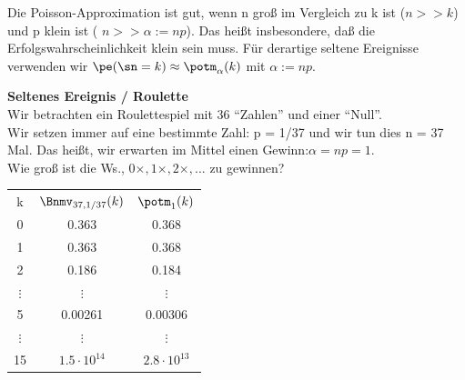 \begin{bem}
    Die Poisson-Approximation ist gut, wenn n groß im Vergleich zu k ist ($n >> k$) und p klein ist (
    $n >> \alpha := np$).
    Das heißt insbesondere, daß die Erfolgswahrscheinlichkeit klein sein muss.
    Für derartige seltene Ereignisse verwenden wir $\pe (\sn = k) \approx \potm_{\alpha}(k)$ mit $\alpha := np$.
\end{bem}


\begin{bsp}
    \textbf{Seltenes Ereignis / Roulette}  \\
    Wir betrachten ein Roulettespiel mit 36 ``Zahlen'' und einer ``Null''. \\
    Wir setzen immer auf eine bestimmte Zahl: p = 1/37 und wir tun dies n = 37 Mal.
    Das heißt, wir erwarten im Mittel einen Gewinn:$\alpha  = np = 1$. \\
    Wie groß ist die Ws., $ 0 \times, 1 \times, 2 \times, ...$ zu gewinnen?
    \begin{mytable}
        \begin{tabular}{ccc}
            k & $\Bnmv_{37,1/37}(k)$ & $\potm_1(k)$ \\
            0 & 0.363 & 0.368 \\
            1 & 0.363 & 0.368 \\
            2 & 0.186 &  0.184 \\
            $\vdots$ & $\vdots$ & $\vdots$ \\
            5&  0.00261 & 0.00306 \\
            $\vdots$ & $\vdots$ & $\vdots$ \\
            15  & $1.5 \cdot 10^{14} $ & $2.8 \cdot 10^{13}$
        \end{tabular} %
    \end{mytable}
\end{bsp}

